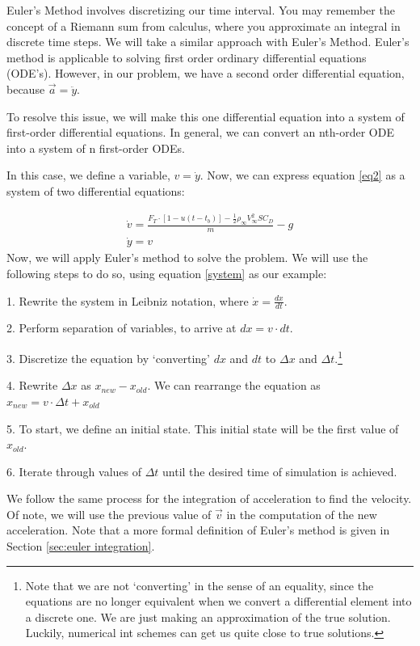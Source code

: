\documentclass[12pt]{report}
\begin{document}
Euler’s Method involves discretizing our time interval. You may remember the concept of a Riemann sum from calculus, where you approximate an integral in discrete time steps. We will take a similar approach with Euler’s Method. Euler’s method is applicable to solving first order ordinary differential equations (ODE’s). However, in our problem, we have a second order differential equation, because $\vec{a}=\ddot{y}$.

To resolve this issue, we will make this one differential equation into a system of first-order differential equations. In general, we can convert an nth-order ODE into a system of n first-order ODEs.

In this case, we define a variable, $v=\dot{y}$. Now, we can express equation \eqref{eq2} as a system of two differential equations:

\begin{gather}\label{system}
        \dot{v}=\frac{F_T \cdot [1-u(t-t_b)]-\frac{1}{2}\rho_{\infty}V_{\infty}^2SC_D}{m}-g\\
    \dot{y}=v
\end{gather}
Now, we will apply Euler’s method to solve the problem. We will use the following steps to do so, using equation \eqref{system} as our example:

1. Rewrite the system in Leibniz notation, where $\dot{x}=\frac{dx}{dt}$.

2. Perform separation of variables, to arrive at $dx=v\cdot dt$.

3. Discretize the equation by ‘converting’  $dx$ and $dt$ to $\Delta x$ and $\Delta t$.\footnote{Note that we are not ‘converting’ in the sense of an equality, since the equations are no longer equivalent when we convert a differential element into a discrete one. We are just making an approximation of the true solution. Luckily, \gls{numerical int} schemes can get us quite close to true solutions. }

4. Rewrite $\Delta x$ as $x_{new}-x_{old}$. We can rearrange the equation as $x_{new}=v\cdot \Delta t + x_{old}$

5. To start, we define an initial state. This initial state will be the first value of $x_{old}$. 

6. Iterate through values of $\Delta t$ until the desired time of simulation is achieved.

We follow the same process for the integration of acceleration to find the velocity. Of note, we will use the previous value of $\vec{v}$ in the computation of the new acceleration. Note that a more formal definition of Euler’s method is given in Section \ref{sec:euler integration}.
\end{document}
